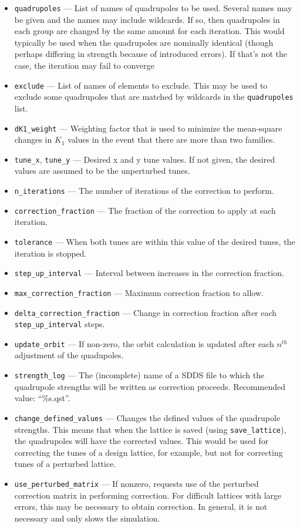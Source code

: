 \documentclass[11pt]{article}
\begin{document}
\begin{itemize}
\item \verb|quadrupoles| --- List of names of quadrupoles to be used.  Several names may be given and the names may include
  wildcards. If so, then quadrupoles in each group are changed by the same amount for each iteration.
  This would typically be used when the quadrupoles are nominally identical (though perhaps differing in strength because of
  introduced errors). If that's not the case, the iteration may fail to converge
\item \verb|exclude| --- List of names of elements to exclude. This may be used to exclude some 
  quadrupoles that are matched by wildcards in the \verb|quadrupoles| list.
\item \verb|dK1_weight| --- Weighting factor that is used to minimize the mean-square changes in $K_1$ values in the
  event that there are more than two families.
\item \verb|tune_x|, \verb|tune_y| --- Desired x and y tune values.  If not given, the desired values are
assumed to be the unperturbed tunes.
\item \verb|n_iterations| --- The number of iterations of the correction to perform.
\item \verb|correction_fraction| --- The fraction of the correction to apply at each iteration.
\item \verb|tolerance| --- When both tunes are within this value of the desired tunes, the
iteration is stopped.
\item \verb|step_up_interval| --- Interval between increases in the correction fraction.
\item \verb|max_correction_fraction| --- Maximum correction fraction to allow.
\item \verb|delta_correction_fraction| --- Change in correction fraction after 
each \verb|step_up_interval| steps.
\item \verb|update_orbit| --- If non-zero, the orbit calculation is updated after each $n^{th}$ adjustment of the
  quadupoles. 
\item \verb|strength_log| --- The (incomplete) name of a SDDS file to which the quadrupole 
strengths will be written as correction proceeds.  Recommended value: ``\%s.qst''.
\item \verb|change_defined_values| --- Changes the defined values of the quadrupole strengths.
This means that when the lattice is saved (using \verb|save_lattice|), the quadrupoles will
have the corrected values.  This would be used for correcting the tunes of a design
lattice, for example, but not for correcting tunes of a perturbed lattice.
\item \verb|use_perturbed_matrix| --- If nonzero, requests use of the perturbed correction matrix in
performing correction.  For difficult lattices with large errors, this may be necessary
to obtain correction.  In general, it is not necessary and only slows the simulation.
\end{itemize}
\end{document}
